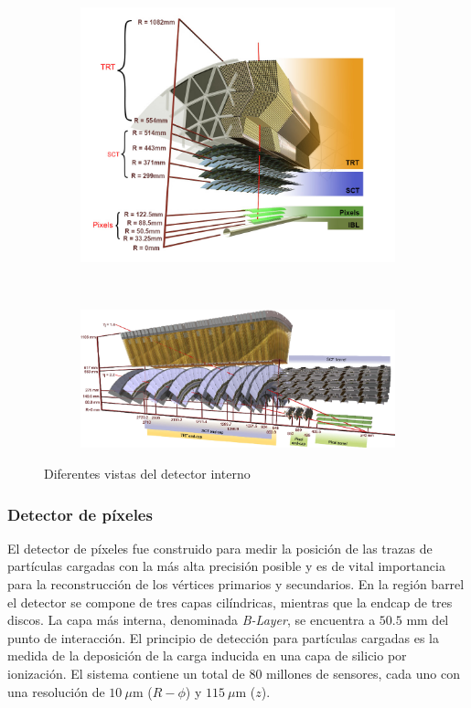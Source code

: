\begin{figure}
\centering
  \begin{subfigure}[b]{0.49\textwidth}
    \includegraphics[width=\textwidth]{images/pixel_1.png}
  \end{subfigure}
  ~
  \begin{subfigure}[b]{0.49\textwidth}
    \includegraphics[width=\textwidth]{images/pixel_4.png}
  \end{subfigure}
  \caption{Diferentes vistas del detector interno}
  \label{pixel_23}
\end{figure}


\subsubsection{Detector de píxeles}

El detector de píxeles fue construido para medir la posición de las trazas de partículas cargadas con la más alta precisión posible y es de vital importancia para la reconstrucción de los vértices primarios y secundarios. En la región barrel el detector se compone de tres capas cilíndricas, mientras que la endcap de tres discos. La capa más interna, denominada \textit{B-Layer}, se encuentra a $50.5$ mm del punto de interacción. El principio de detección para partículas cargadas es la medida de la deposición de la carga inducida en una capa de silicio por ionización. El sistema contiene un total de $80$ millones de sensores, cada uno con una resolución de $10\:\mu$m ($R-\phi$) y $115\:\mu$m ($z$).

